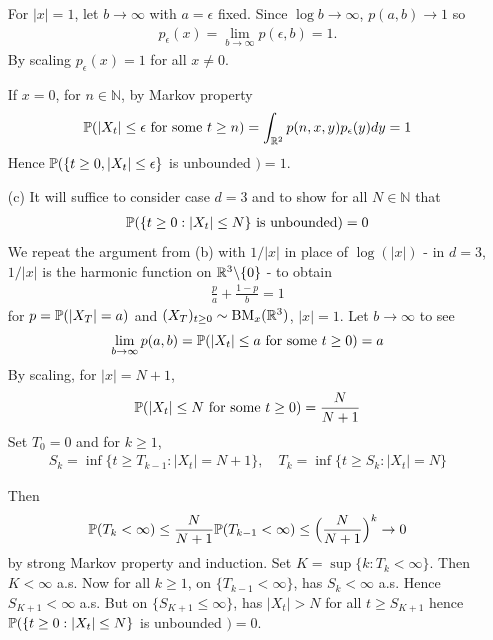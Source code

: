 \documentclass[12pt,a4paper]{report}
\newenvironment{proof}
{\begin{changemargin}{1cm}{0.5cm} 
	}%
	{\end{changemargin}
}
\begin{document}
\begin{proof}
\begin{itemize}
For $|x|=1$, let $b\rightarrow \infty$ with $a= \epsilon$ fixed. Since $\log b \rightarrow \infty$, $p(a,b)  \rightarrow 1$ so
\begin{align*}
p_{\epsilon} (x) = \lim_{b\rightarrow \infty} p(\epsilon, b)=1.
\end{align*}
By scaling $p_{\epsilon}(x) =1$ for all $x\neq 0$.

\quad If $x=0$, for $n\in \mathbb{N}$, by Markov property
\begin{align*}
\mathbb{P}(|X_t| \leq \epsilon \text{ for some } t\geq n) = \int_{\mathbb{R}^2} p(n,x,y) p_{\epsilon}(y) dy =1
\end{align*}
Hence $\mathbb{P}(\{ t\geq 0, |X_t| \leq \epsilon \}$ is unbounded $)=1$.
\item[(c)] It will suffice to consider case $d=3$ and to show for all $N\in \mathbb{N}$ that
\begin{align*}
\mathbb{P} ( \{ t\geq 0 : |X_t| \leq N  \} \text{ is unbounded} ) =0
\end{align*}
We repeat the argument from (b) with $1/|x|$ in place of $\log (|x|)$ - in $d=3$, $1/|x|$ is the harmonic function on $\mathbb{R}^3 \backslash \{ 0 \}$ - to obtain
\begin{align*}
\frac{p}{a} + \frac{1-p}{b} =1
\end{align*}
for $p = \mathbb{P}(|X_T|=a)$ and $(X_T)_{t\geq 0} \sim \text{BM}_x (\mathbb{R}^3)$, $|x|=1$. Let $b\rightarrow \infty$ to see 
\begin{align*}
\lim_{b\rightarrow \infty} p(a,b)  =\mathbb{P} (|X_t| \leq a \text{ for some } t\geq 0) =a
\end{align*} 
By scaling, for $|x| = N+1$,
\begin{align*}
\mathbb{P}( |X_t| \leq N \text{ for some } t\geq 0) = \frac{N}{N+1}
\end{align*}
Set $T_0 =0$ and for $k\geq 1$,
\begin{align*}
S_k = \inf \{ t\geq T_{k-1} : |X_t| = N+1 \}, \quad T_k = \inf \{ t \geq S_k : |X_t| =N \}
\end{align*}

Then
\begin{align*}
\mathbb{P}( T_k < \infty) \leq \frac{N}{N+1} \mathbb{P} (T_{k-1} < \infty) \leq \Big(\frac{N}{N+1} \Big)^k \rightarrow 0
\end{align*}
by strong Markov property and induction. Set $K = \sup \{ k : T_k < \infty  \}$. Then $K< \infty$ a.s. Now for all $k \geq 1$, on $\{T_{k-1} < \infty \}$, has $S_{k} < \infty$ a.s. Hence $S_{K+1} < \infty$ a.s. But on $\{S_{K+1} \leq \infty \}$, has $|X_t| >N$ for all $t\geq S_{K+1}$ hence $\mathbb{P}( \{ t\geq 0 : |X_t | \leq N \}$ is unbounded $)= 0$.
\end{itemize}

\eop
\end{proof}
\end{document}
